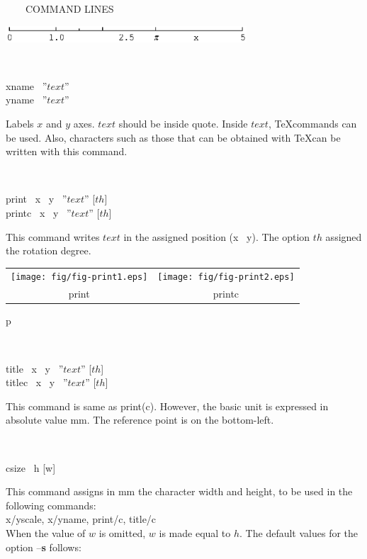 \begin{qsection}{\ ~~~COMMAND LINES}
\begin{minipage}[t]{9cm}
\includegraphics[width=9cm]{fig/scale.eps}
\end{minipage}\\

\begin{minipage}[t]{5.5cm}
xname ~''$text$''\\
yname ~''$text$''\\
\end{minipage}
\begin{minipage}[t]{9cm}
Labels $x$ and $y$ axes.
$text$ should be inside quote.
Inside $text$, \TeX commands can be used.
Also, characters such as those that can be obtained
with \TeX can be written with this command.
\end{minipage}\\

\begin{minipage}[t]{5.5cm}
 print ~x ~y ~''$text$'' [$th$]\\
 printc ~x ~y ~''$text$'' [$th$]
\end{minipage}
\begin{minipage}[t]{9cm}
This command writes $text$ in the assigned position (x ~y).
The option $th$ assigned the rotation degree.

\begin{tabular}{cc}
\texttt{[image: fig/fig-print1.eps]}&  
\texttt{[image: fig/fig-print2.eps]}\\
print&printc
\end{tabular}p
\end{minipage}\\

\begin{minipage}[t]{5.5cm}
title ~x ~y ~''$text$'' [$th$]\\
titlec ~x ~y ~''$text$'' [$th$]
\end{minipage}
\begin{minipage}[t]{9cm}
This command is same as print(c).
However, the basic unit is expressed in absolute value mm.
The reference point is on the bottom-left.
\end{minipage}\\

\begin{minipage}[t]{5.5cm}
csize ~h [w]
\end{minipage}
\begin{minipage}[t]{9cm}
This command assigns in mm the character width and height,
to be used in the following commands:\\
x/yscale, x/yname, print/c, title/c\\
When the value of $w$ is omitted, $w$ is made equal to $h$.
The default values for the option --{\bf s} follows:
\begin{tabular}{ccc}


\end{tabular}
\end{minipage}
\end{qsection}
